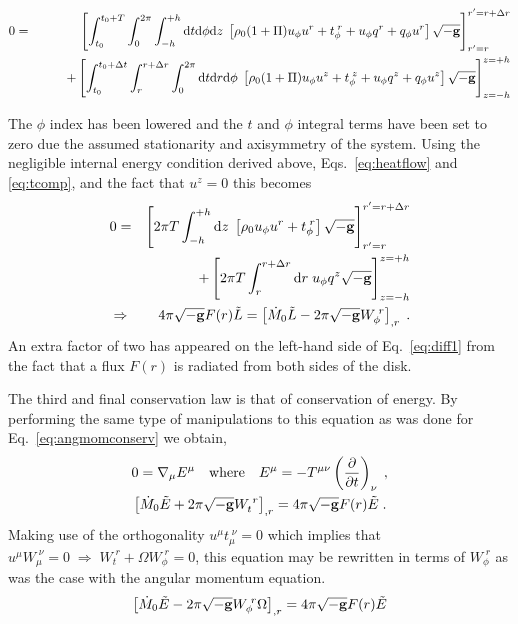 \begin{widetext}
\begin{eqnarray}\label{eq:angmomconserv}
&0=&\left[\int^{t_{0}+T}_{t_{0}}\int^{2\pi}_{0}\int^{+h}_{-h}\textrm{d}t\textrm{d}\phi\textrm{d}z\; \left[\rho_{0}(1+\Pi)u_{\phi}u^{r} + t_{\phi}^{\;r} +u_{\phi}q^{r} + q_{\phi}u^{r} \right] \sqrt{-{\bf{g}}} \right]^{r'=r+\Delta r}_{r'=r}\nonumber\\
&&\quad\quad +\left[\int_{t_{0}}^{t_{0}+\Delta t}\int_{r}^{r+\Delta r}\int_{0}^{2\pi}\textrm{d}t\textrm{d}r\textrm{d}\phi\; \left[ \rho_{0}(1+\Pi)u_{\phi}u^{z} + t_{\phi}^{\;z}+u_{\phi}q^{z}+q_{\phi}u^{z} \right] \sqrt{-{\bf{g}}}  \right]^{z=+h}_{z=-h} 
\end{eqnarray}\end{widetext}
The $\phi$ index has been lowered and the $t$ and $\phi$ integral terms have been set to zero due the assumed stationarity and axisymmetry of the system. Using the negligible internal energy condition derived above, Eqs.\ \ref{eq:heatflow} and \ref{eq:tcomp}, and the fact that $u^{z}=0$ this becomes
\begin{eqnarray}  
&0=&\left[2\pi T\int_{-h}^{+h}\textrm{d}z\; \left[\rho_{0}u_{\phi}u^{r} + t_{\phi}^{\;r}\right] \sqrt{-{\bf{g}}} \right]^{r'=r+\Delta r}_{r'=r}\nonumber\\
&&+\left[2\pi T \int_{r}^{r+\Delta r}\textrm{d}r\; u_{\phi}q^{z} \sqrt{-{\bf{g}}}  \right]^{z=+h}_{z=-h} \\
&\Rightarrow&4\pi\sqrt{-{\bf{g}}}F(r)\tilde{L}=\left[\dot{M}_{0}\tilde{L}-2\pi \sqrt{-{\bf{g}}}W_{\phi}^{\; r}\right]_{,r} \; .\label{eq:diff1}
\end{eqnarray}
An extra factor of two has appeared on the left-hand side of Eq.\ \ref{eq:diff1} from the fact that a flux $F(r)$ is radiated from both sides of the disk.

The third and final conservation law is that of conservation of energy. By performing the same type of manipulations to this equation as was done for Eq.\ \ref{eq:angmomconserv} we obtain,
\begin{eqnarray} & 0=\nabla_{\mu}E^{\mu}\quad\textrm{where}\quad E^{\mu}=-T^{\mu\nu}\left(\frac{\partial}{\partial t}\right)_{\nu}\; , \\
&\left[ \dot{M}_{0}\tilde{E}+2\pi \sqrt{-{\bf{g}}}W_{t}^{\; r} \right]_{,r} = 4\pi \sqrt{-{\bf{g}}}F(r)\tilde{E} \; .\end{eqnarray}
Making use of the orthogonality $u^{\mu}t_{\mu}^{\; \nu}=0$ which implies that $u^{\mu}W_{\mu}^{\;\nu}=0\;\Rightarrow\; W_{t}^{\;r}+\Omega W_{\phi}^{\;r}=0$, this equation may be rewritten in terms of $W_{\phi}^{\; r}$ as was the case with the angular momentum equation.
\begin{equation}\label{eq:diff2} \left[ \dot{M}_{0}\tilde{E}-2\pi \sqrt{-{\bf{g}}}W_{\phi}^{\; r}\Omega \right]_{,r} = 4\pi \sqrt{-{\bf{g}}}F(r)\tilde{E} \end{equation}


